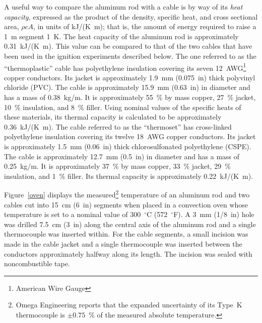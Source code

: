 A useful way to compare the aluminum rod with a cable is by way of its {\em heat capacity}, expressed as the product of the density, specific heat, and cross sectional area, $\rho c A$, in units of kJ/(K~m); that is, the amount of energy required to raise a 1~m segment 1~K. The heat capacity of the aluminum rod is approximately 0.31~kJ/(K~m). This value can be compared to that of the two cables that have been used in the ignition experiments described below. The one referred to as the ``thermoplastic'' cable has polyethylene insulation covering its seven 12~AWG\footnote{American Wire Gauge} copper conductors. Its jacket is approximately 1.9~mm (0.075~in) thick polyvinyl chloride (PVC). The cable is approximately 15.9~mm (0.63~in) in diameter and has a mass of 0.38~kg/m. It is approximately 55~\% by mass copper, 27~\% jacket, 10~\% insulation, and 8~\% filler. Using nominal values of the specific heats of these materials, its thermal capacity is calculated to be approximately 0.36~kJ/(K~m). The cable referred to as the ``thermoset'' has cross-linked polyethylene insulation covering its twelve 18~AWG copper conductors. Its jacket is approximately 1.5~mm (0.06~in) thick chlorosulfonated polyethylene (CSPE). The cable is approximately 12.7~mm (0.5~in) in diameter and has a mass of 0.25~kg/m. It is approximately 37~\% by mass copper, 33~\% jacket, 29~\% insulation, and 1~\% filler. Its thermal capacity is approximately 0.22~kJ/(K~m).

Figure~\ref{oven} displays the measured\footnote{Omega Engineering reports that the expanded uncertainty of its Type~K thermocouple is $\pm 0.75$~\% of the measured absolute temperature.} temperature of an aluminum rod and two cables cut into 15~cm (6~in) segments when placed in a convection oven whose temperature is set to a nominal value of 300~$^\circ$C (572~$^\circ$F). A 3~mm (1/8~in) hole was drilled 7.5~cm (3~in) along the central axis of the aluminum rod and a single thermocouple was inserted within. For the cable segments, a small incision was made in the cable jacket and a single thermocouple was inserted between the conductors approximately halfway along its length. The incision was sealed with noncombustible tape.

